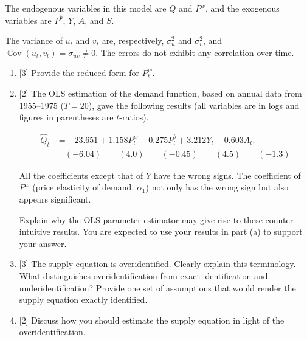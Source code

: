 \documentclass[12pt]{article}
\DeclareMathOperator{\Cov}{\mathbb{C}ov}
\begin{document}
\begin{enumerate}
    The endogenous variables in this model are $Q$ and $P^w$, and the exogenous variables are $P^b$, $Y$, $A$, and $S$.
    
    The variance of $u_t$ and $v_t$ are, respectively, $\sigma_u^2$ and $\sigma_v^2$, and $\Cov(u_t, v_t) = \sigma_{uv} \neq 0$. The errors do not exhibit any correlation over time.
    
    \begin{enumerate}
        \item {[3]} Provide the reduced form for $P^w_t$. 
        
        \item {[2]} The OLS estimation of the demand function, based on annual data from 1955–1975 ($T = 20$), gave the following results (all variables are in logs and figures in parentheses are $t$-ratios).
    
        \begin{align*}
            \hat{Q}_t &= -23.651 + 1.158 P^w_t - 0.275 P^b_t + 3.212 Y_t - 0.603 A_t. \\
            & \quad (-6.04) \quad  \quad  (4.0) \quad  \quad (-0.45) \quad  \quad  (4.5)  \quad \quad (-1.3)
        \end{align*}
    
        All the coefficients except that of $Y$ have the wrong signs. The coefficient of $P^w$ (price elasticity of demand, $\alpha_1$) not only has the wrong sign but also appears significant.
    
        Explain why the OLS parameter estimator may give rise to these counter-intuitive results. You are expected to use your results in part (a) to support your answer. 
    
        \item {[3]} The supply equation is overidentified. Clearly explain this terminology. What distinguishes overidentification from exact identification and underidentification? Provide one set of assumptions that would render the supply equation exactly identified. 
    
        \item {[2]} Discuss how you should estimate the supply equation in light of the overidentification. 
    \end{enumerate}


\end{enumerate}
\end{document}

